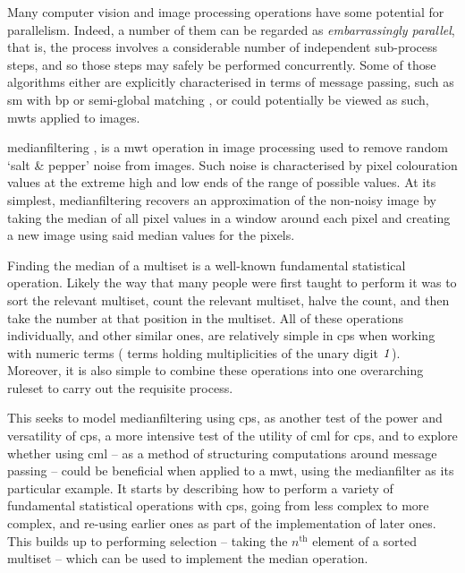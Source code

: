Many computer vision and image processing operations have some potential for parallelism.  Indeed, a number of them can be regarded as \emph{embarrassingly parallel}, that is, the process involves a considerable number of independent sub-process steps, and so those steps may safely be performed concurrently.  Some of those algorithms either are explicitly characterised in terms of message passing, such as \gls{sm} with \gls{bp} \cite{Liang2011} or semi-global matching \cite{Drory2014}, or could potentially be viewed as such, \eg{} \glspl{mwt} applied to images.

\Gls{medianfilter}ing \cite[Chap. 3.4.1]{Gimelfarb2018}, \cite{Fisher2016} is a \gls{mwt} operation in image processing used to remove random `salt \& pepper' noise from images.  Such noise is characterised by pixel colouration values at the extreme high and low ends of the range of possible values.  At its simplest, \gls{medianfilter}ing recovers an approximation of the non-noisy image by taking the median of all pixel values in a window around each pixel and creating a new image using said median values for the pixels.

Finding the median of a multiset is a well-known fundamental statistical operation.  Likely the way that many people were first taught to perform it was to sort the relevant multiset, count the relevant multiset, halve the count, and then take the number at that position in the multiset.  All of these operations individually, and other similar ones, are relatively simple in \gls{cps} when working with numeric terms (\ie{} terms holding multiplicities of the unary digit \(\mathit{1}\)).  Moreover, it is also simple to combine these operations into one overarching \gls{ruleset} to carry out the requisite process.

This  seeks to model \gls{medianfilter}ing using \gls{cps}, as another test of the power and versatility of \gls{cps}, a more intensive test of the utility of \gls{cml} for \gls{cps}, and to explore whether using \gls{cml} -- as a method of structuring computations around message passing -- could be beneficial when applied to a \gls{mwt}, using the \gls{medianfilter} as its particular example.  It starts by describing how to perform a variety of fundamental statistical operations with \gls{cps}, going from less complex to more complex, and re-using earlier ones as part of the implementation of later ones.  This builds up to performing selection -- taking the \(n^{\text{th}}\) element of a sorted multiset -- which can be used to implement the median operation.

